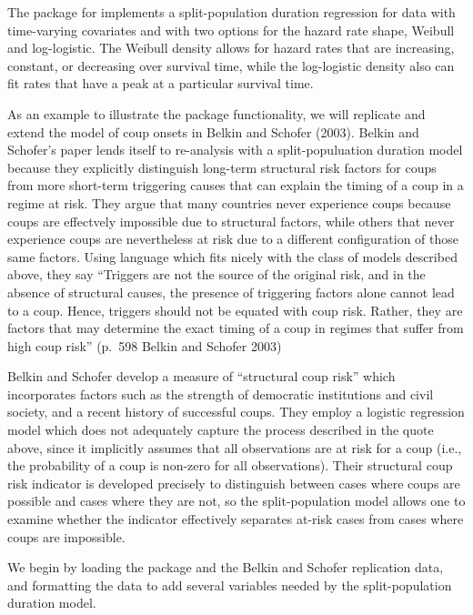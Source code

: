 \documentclass[article]{jss}
\begin{document}
The  package for  implements a
split-population duration regression for data with time-varying
covariates and with two options for the hazard rate shape, Weibull and
log-logistic. The Weibull density allows for hazard rates that are
increasing, constant, or decreasing over survival time, while the
log-logistic density also can fit rates that have a peak at a particular
survival time.

As an example to illustrate the package functionality, we will replicate
and extend the model of coup onsets in Belkin and Schofer (2003). Belkin
and Schofer's paper lends itself to re-analysis with a split-populuation
duration model because they explicitly distinguish long-term structural
risk factors for coups from more short-term triggering causes that can
explain the timing of a coup in a regime at risk. They argue that many
countries never experience coups because coups are effectvely impossible
due to structural factors, while others that never experience coups are
nevertheless at risk due to a different configuration of those same
factors. Using language which fits nicely with the class of models
described above, they say ``Triggers are not the source of the original
risk, and in the absence of structural causes, the presence of
triggering factors alone cannot lead to a coup. Hence, triggers should
not be equated with coup risk. Rather, they are factors that may
determine the exact timing of a coup in regimes that suffer from high
coup risk'' (p.~598 Belkin and Schofer 2003)

Belkin and Schofer develop a measure of ``structural coup risk'' which
incorporates factors such as the strength of democratic institutions and
civil society, and a recent history of successful coups. They employ a
logistic regression model which does not adequately capture the process
described in the quote above, since it implicitly assumes that all
observations are at risk for a coup (i.e., the probability of a coup is
non-zero for all observations). Their structural coup risk indicator is
developed precisely to distinguish between cases where coups are
possible and cases where they are not, so the split-population model
allows one to examine whether the indicator effectively separates
at-risk cases from cases where coups are impossible.

We begin by loading the package and the Belkin and Schofer replication
data, and formatting the data to add several variables needed by the
split-population duration model.
\end{document}
